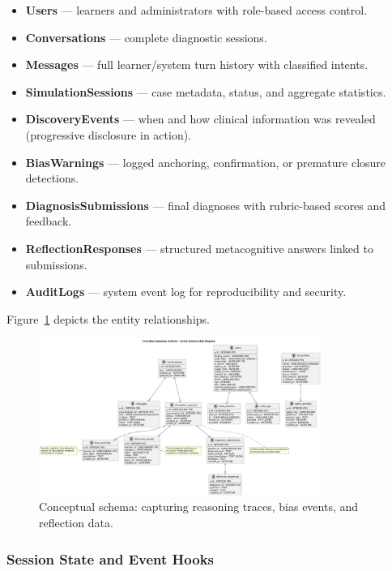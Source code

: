 \begin{itemize}
  \item \textbf{Users} --- learners and administrators with role-based access control.
  \item \textbf{Conversations} --- complete diagnostic sessions.
  \item \textbf{Messages} --- full learner/system turn history with classified intents.
  \item \textbf{SimulationSessions} --- case metadata, status, and aggregate statistics.
  \item \textbf{DiscoveryEvents} --- when and how clinical information was revealed
        (progressive disclosure in action).
  \item \textbf{BiasWarnings} --- logged anchoring, confirmation, or premature closure detections.
  \item \textbf{DiagnosisSubmissions} --- final diagnoses with rubric-based scores and feedback.
  \item \textbf{ReflectionResponses} --- structured metacognitive answers linked to submissions.
  \item \textbf{AuditLogs} --- system event log for reproducibility and security.
\end{itemize}

Figure~\ref{fig:db_schema} depicts the entity relationships.

\begin{figure}[h]
    \centering
    \includegraphics[width=0.82\textwidth]{figures/diagrams/erdb.png}
    \caption{Conceptual schema: capturing reasoning traces, bias events, and reflection data.}
    \label{fig:db_schema}
\end{figure}

\subsubsection{Session State and Event Hooks}

